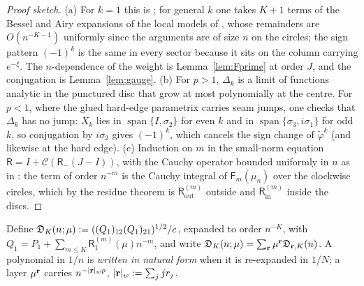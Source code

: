 \begin{proof}[Proof sketch]
(a) For $k=1$ this is \cite[Lemmas~9.1, 9.2, 10.6]{PaperII}; for general $k$ one takes $K+1$ terms of the Bessel \cite[(10.40.1)--(10.40.4),
(10.17.5)--(10.17.12)]{DLMF} and Airy \cite[(9.7.5)--(9.7.6)]{DLMF} expansions of the local models of \cite[\S6]{KMVV}, whose remainders are
$O(n^{-K-1})$ uniformly since the arguments are of size $n$ on the circles; the sign pattern $(-1)^k$ is the same in every sector because it
sits on the column carrying $e^{-\xi}$. The $n$-dependence of the weight is Lemma~\ref{lem:Fprime} at order $J$, and the conjugation is
Lemma~\ref{lem:gauge}. (b) For $p>1$, $\Delta_k$ is a limit of functions analytic in the punctured disc that grow at most polynomially at the
centre. For $p<1$, where the glued hard-edge parametrix carries seam jumps, one checks that $\Delta_k$ has no jump: $X_k$ lies in
$\operatorname{span}\{I,\sigma_2\}$ for even $k$ and in $\operatorname{span}\{\sigma_3,i\sigma_1\}$ for odd $k$, so conjugation by $i\sigma_2$
gives $(-1)^k$, which cancels the sign change of $\tilde\varphi^k$ (and likewise at the hard edge). (c) Induction on $m$ in the small-norm
equation $\mathsf R=I+\mathcal C(\mathsf R_-(J-I))$, with the Cauchy operator bounded uniformly in $n$ as in \cite[Propositions~9.5,
10.8]{PaperII}: the term of order $n^{-m}$ is the Cauchy integral of $\mathsf F_m(\mu_n)$ over the clockwise circles, which by the residue
theorem is $\mathsf R^{(m)}_{\mathrm{out}}$ outside and $\mathsf R^{(m)}_{\mathrm{in}}$ inside the discs.
\end{proof}

Define $\mathfrak D_K(n;\mu):=((Q_1)_{12}(Q_1)_{21})^{1/2}/c$, expanded to order $n^{-K}$, with $Q_1=P_1+\sum_{m\le K}\mathsf R_1^{(m)}(\mu)n^{-m}$, and
write $\mathfrak D_K(n;\mu)=\sum_{\mathbf r}\mu^{\mathbf r}\mathfrak D_{\mathbf r,K}(n)$. A polynomial in $1/n$ is \emph{written in natural form} when it is re-expanded in
$1/N$; a layer $\mu^{\mathbf r}$ carries $n^{-|\mathbf r|_wp}$, $|\mathbf r|_w:=\sum_jjr_j$.

